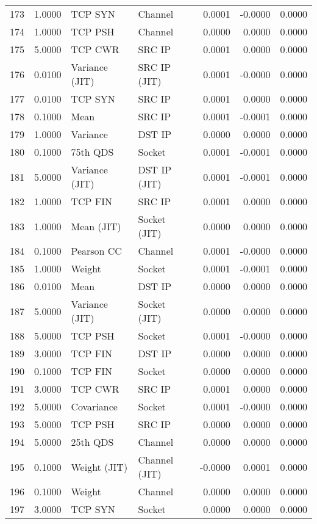 \begin{longtable}{lrllrrr}
173 & 1.0000 & TCP SYN & Channel & 0.0001 & -0.0000 & 0.0000 \\
174 & 1.0000 & TCP PSH & Channel & 0.0000 & 0.0000 & 0.0000 \\
175 & 5.0000 & TCP CWR & SRC IP & 0.0001 & 0.0000 & 0.0000 \\
176 & 0.0100 & Variance (JIT) & SRC IP (JIT) & 0.0001 & -0.0000 & 0.0000 \\
177 & 0.0100 & TCP SYN & SRC IP & 0.0001 & 0.0000 & 0.0000 \\
178 & 0.1000 & Mean & SRC IP & 0.0001 & -0.0001 & 0.0000 \\
179 & 1.0000 & Variance & DST IP & 0.0000 & 0.0000 & 0.0000 \\
180 & 0.1000 & 75th QDS & Socket & 0.0001 & -0.0001 & 0.0000 \\
181 & 5.0000 & Variance (JIT) & DST IP (JIT) & 0.0001 & -0.0001 & 0.0000 \\
182 & 1.0000 & TCP FIN & SRC IP & 0.0001 & 0.0000 & 0.0000 \\
183 & 1.0000 & Mean (JIT) & Socket (JIT) & 0.0000 & 0.0000 & 0.0000 \\
184 & 0.1000 & Pearson CC & Channel & 0.0001 & -0.0000 & 0.0000 \\
185 & 1.0000 & Weight & Socket & 0.0001 & -0.0001 & 0.0000 \\
186 & 0.0100 & Mean & DST IP & 0.0000 & 0.0000 & 0.0000 \\
187 & 5.0000 & Variance (JIT) & Socket (JIT) & 0.0000 & 0.0000 & 0.0000 \\
188 & 5.0000 & TCP PSH & Socket & 0.0001 & -0.0000 & 0.0000 \\
189 & 3.0000 & TCP FIN & DST IP & 0.0000 & 0.0000 & 0.0000 \\
190 & 0.1000 & TCP FIN & Socket & 0.0000 & 0.0000 & 0.0000 \\
191 & 3.0000 & TCP CWR & SRC IP & 0.0001 & 0.0000 & 0.0000 \\
192 & 5.0000 & Covariance & Socket & 0.0001 & -0.0000 & 0.0000 \\
193 & 5.0000 & TCP PSH & SRC IP & 0.0000 & 0.0000 & 0.0000 \\
194 & 5.0000 & 25th QDS & Channel & 0.0000 & 0.0000 & 0.0000 \\
195 & 0.1000 & Weight (JIT) & Channel (JIT) & -0.0000 & 0.0001 & 0.0000 \\
196 & 0.1000 & Weight & Channel & 0.0000 & 0.0000 & 0.0000 \\
197 & 3.0000 & TCP SYN & Socket & 0.0000 & 0.0000 & 0.0000 \\

\end{longtable}
